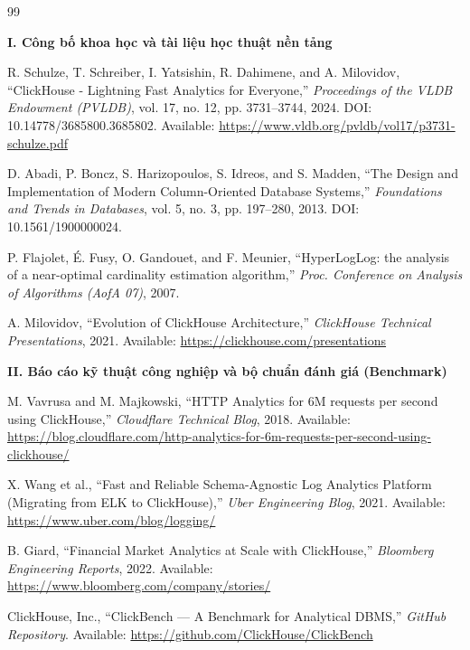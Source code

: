 \documentclass[13pt,a4paper]{report}
\begin{document}
\begin{thebibliography}{99}
\small
{}
\setlength{\parskip}{0pt}
\setlength{\itemsep}{1.5pt}

\item[] \hspace{-\leftmargin}\textbf{I. Công bố khoa học và tài liệu học thuật nền tảng}

 R. Schulze, T. Schreiber, I. Yatsishin, R. Dahimene, and A. Milovidov, ``ClickHouse - Lightning Fast Analytics for Everyone,'' \textit{Proceedings of the VLDB Endowment (PVLDB)}, vol. 17, no. 12, pp. 3731--3744, 2024. DOI: 10.14778/3685800.3685802. Available: \url{https://www.vldb.org/pvldb/vol17/p3731-schulze.pdf}

 D. Abadi, P. Boncz, S. Harizopoulos, S. Idreos, and S. Madden, ``The Design and Implementation of Modern Column-Oriented Database Systems,'' \textit{Foundations and Trends in Databases}, vol. 5, no. 3, pp. 197--280, 2013. DOI: 10.1561/1900000024.

 P. Flajolet, \'E. Fusy, O. Gandouet, and F. Meunier, ``HyperLogLog: the analysis of a near-optimal cardinality estimation algorithm,'' \textit{Proc. Conference on Analysis of Algorithms (AofA 07)}, 2007.

 A. Milovidov, ``Evolution of ClickHouse Architecture,'' \textit{ClickHouse Technical Presentations}, 2021. Available: \url{https://clickhouse.com/presentations}

\item[] \hspace{-\leftmargin}\textbf{II. Báo cáo kỹ thuật công nghiệp và bộ chuẩn đánh giá (Benchmark)}

 M. Vavrusa and M. Majkowski, ``HTTP Analytics for 6M requests per second using ClickHouse,'' \textit{Cloudflare Technical Blog}, 2018. Available: \url{https://blog.cloudflare.com/http-analytics-for-6m-requests-per-second-using-clickhouse/}

 X. Wang et al., ``Fast and Reliable Schema-Agnostic Log Analytics Platform (Migrating from ELK to ClickHouse),'' \textit{Uber Engineering Blog}, 2021. Available: \url{https://www.uber.com/blog/logging/}

 B. Giard, ``Financial Market Analytics at Scale with ClickHouse,'' \textit{Bloomberg Engineering Reports}, 2022. Available: \url{https://www.bloomberg.com/company/stories/}

 ClickHouse, Inc., ``ClickBench --- A Benchmark for Analytical DBMS,'' \textit{GitHub Repository}. Available: \url{https://github.com/ClickHouse/ClickBench}


\end{thebibliography}
\end{document}
